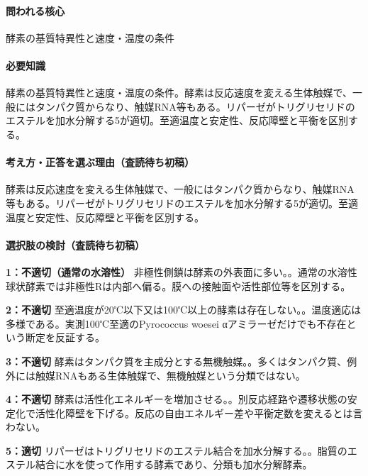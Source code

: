 \paragraph{問われる核心} 酵素の基質特異性と速度・温度の条件

\paragraph{必要知識} 酵素の基質特異性と速度・温度の条件。酵素は反応速度を変える生体触媒で、一般にはタンパク質からなり、触媒RNA等もある。リパーゼがトリグリセリドのエステルを加水分解する5が適切。至適温度と安定性、反応障壁と平衡を区別する。

\paragraph{考え方・正答を選ぶ理由（査読待ち初稿）} 酵素は反応速度を変える生体触媒で、一般にはタンパク質からなり、触媒RNA等もある。リパーゼがトリグリセリドのエステルを加水分解する5が適切。至適温度と安定性、反応障壁と平衡を区別する。

\paragraph{選択肢の検討（査読待ち初稿）}\mbox{}\par

\noindent\textbf{1：不適切（通常の水溶性）} 非極性側鎖は酵素の外表面に多い。。通常の水溶性球状酵素では非極性Rは内部へ偏る。膜への接触面や活性部位等を区別する。\par

\noindent\textbf{2：不適切} 至適温度が20℃以下又は100℃以上の酵素は存在しない。。温度適応は多様である。実測100℃至適のPyrococcus woesei αアミラーゼだけでも不存在という断定を反証する。\par

\noindent\textbf{3：不適切} 酵素はタンパク質を主成分とする無機触媒。。多くはタンパク質、例外には触媒RNAもある生体触媒で、無機触媒という分類ではない。\par

\noindent\textbf{4：不適切} 酵素は活性化エネルギーを増加させる。。別反応経路や遷移状態の安定化で活性化障壁を下げる。反応の自由エネルギー差や平衡定数を変えるとは言わない。\par

\noindent\textbf{5：適切} リパーゼはトリグリセリドのエステル結合を加水分解する。。脂質のエステル結合に水を使って作用する酵素であり、分類も加水分解酵素。\par

